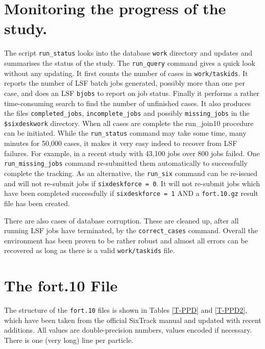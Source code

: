 \documentclass{article}    %
\begin{document}
\section{Monitoring the progress of the study.}
\label{sec:status}
The script {\tt run\_status} looks into the database {\tt work} directory and updates and summarises
the status of the study. The {\tt run\_query} command gives a quick look without
any updating. It first counts the number of cases in {\tt work/taskids}.
It reports the number of LSF batch jobs generated, possibly
more than one per case, and does an LSF {\tt bjobs} to report on job status.
Finally it performs a rather time-consuming search to find the number of unfinished cases.
It also produces the files {\tt completed\_jobs}, {\tt incomplete\_jobs}
and possibly {\tt missing\_jobs} in the
{\tt \$sixdeskwork} directory.  When all cases are complete the {run\_join10} procedure can
be initiated. While the {\tt run\_status} command may take some time, many minutes for
50,000 cases, it makes it very easy indeed to recover from LSF failures. For example, in
a recent study with 43,100 jobs over 800 jobs failed. One {\tt run\_missing\_jobs}
command re-submitted them automatically to successfully complete the tracking.  
As an alternative, the {\tt run\_six} command can be re-issued and will not re-submit
jobs if {\tt sixdeskforce = 0}. It will not re-submit jobs which have been completed successfully
if {\tt sixdeskforce = 1} AND a {\tt fort.10.gz} result file has been created.

There are also cases of database corruption. These are cleaned up, after all running LSF jobs
have terminated, by the {\tt correct\_cases} command. Overall the environment has
been proven to be rather robust and almost all errors can be recovered
as long as there is a valid {\tt work/taskids} file.

\section{The fort.10 File}
\label{sec:fort10}
The structure of the {\tt fort.10} files is shown in Tables
\ref{T-PPD} and \ref{T-PPD2}, which have been taken from the official
SixTrack manual \cite{SixTrack} and updated with recent additions.
All values are double-precision numbers, values encoded if necessary.
There is one (very long) line per particle.

 \setcounter{dst}{0}
\end{document}
